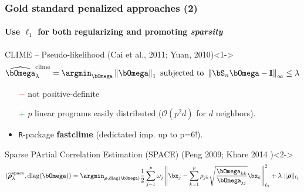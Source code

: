 \begin{frame}
  \frametitle{Gold standard penalized approaches (2)}
  \framesubtitle{Use $\ell_1$ for both regularizing and promoting \textit{sparsity}}

  \begin{overlayarea}{\textwidth}{\textheight}

    \begin{block}{CLIME -- Pseudo-likelihood  (Cai et al., 2011;
        Yuan, 2010)}<1->
      \vspace*{-1.5em}
      \begin{equation*}
        \widehat{\invcov}^{\text{clime}}_\lambda  = \argmin_{\invcov}
        \left\|   \invcov \right\|_1 \text{ subjected to }
        \left\|   \empcov \invcov - \mathbf{I} \right\|_\infty\leq \lambda
      \end{equation*}
      \vspace*{-1.5em}
    \end{block}

    \begin{itemize}
    \item[\textcolor{red}{$-$}] not positive-definite
    \item[\textcolor{green}{$+$}]  $p$ linear  programs easily
      distributed ($\mathcal{O}(p^2d)$ for $d$ neighbors).
    \item \texttt{R}-package \textbf{fastclime} (dedictated imp. up to p=6!).
    \end{itemize}

      \vspace*{-.5em}

    \begin{block}{Sparse PArtial  Correlation Estimation (SPACE)
        (Peng 2009; Khare 2014 )}<2->
      \vspace*{-2em}
      \begin{equation*}
        \left(\widehat{\boldsymbol\rho}_\lambda^{\text{space}}, \mathrm{diag}({\boldsymbol\invcov})\right) =
        \argmin_{\boldsymbol\rho,\mathrm{diag}({\boldsymbol\invcov})} \frac{1}{2}
        \sum_{j=1}^p \omega_j \left\|
          \bx_j - \sum_{k=1}^p \rho_{jk} \sqrt{\frac{{\invcov}_{kk}}{{\invcov}_{jj}}}
          \bx_k \right\|_{\ell_2}^2 + \lambda\ \| \boldsymbol\rho \|_{\ell_1}
      \end{equation*}
      \vspace*{-1.5em}
    \end{block}


\end{overlayarea}

\end{frame}

